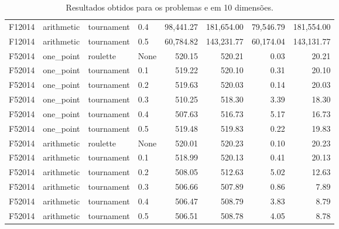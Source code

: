\begin{table}[!ht]
{\begin{tabular}{llllrrrr}
            F12014                                     & arithmetic & tournament & 0.4  & 98,441.27    & 181,654.00    & 79,546.79    & 181,554.00    \\
            F12014                                     & arithmetic & tournament & 0.5  & 60,784.82    & 143,231.77    & 60,174.04    & 143,131.77    \\
            F52014                                     & one\_point & roulette   & None & 520.15       & 520.21        & 0.03         & 20.21         \\
            F52014                                     & one\_point & tournament & 0.1  & 519.22       & 520.10        & 0.31         & 20.10         \\
            F52014                                     & one\_point & tournament & 0.2  & 519.63       & 520.03        & 0.14         & 20.03         \\
            F52014                                     & one\_point & tournament & 0.3  & 510.25       & 518.30        & 3.39         & 18.30         \\
            F52014                                     & one\_point & tournament & 0.4  & 507.63       & 516.73        & 5.17         & 16.73         \\
            F52014                                     & one\_point & tournament & 0.5  & 519.48       & 519.83        & 0.22         & 19.83         \\
            F52014                                     & arithmetic & roulette   & None & 520.01       & 520.23        & 0.10         & 20.23         \\
            F52014                                     & arithmetic & tournament & 0.1  & 518.99       & 520.13        & 0.41         & 20.13         \\
            F52014                                     & arithmetic & tournament & 0.2  & 508.05       & 512.63        & 5.02         & 12.63         \\
            F52014                                     & arithmetic & tournament & 0.3  & 506.66       & 507.89        & 0.86         & 7.89          \\
            F52014                                     & arithmetic & tournament & 0.4  & 506.47       & 508.79        & 3.83         & 8.79          \\
            F52014                                     & arithmetic & tournament & 0.5  & 506.51       & 508.78        & 4.05         & 8.78          \\
            \toprule
        \end{tabular}%
    }
    \caption{Resultados obtidos para os problemas  e  em 10 dimensões.
    }%
    \label{tab:fitness_10}
\end{table}

